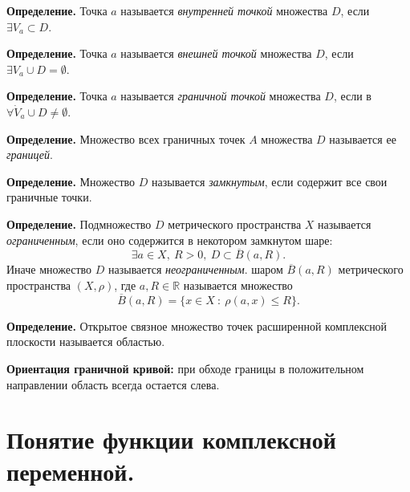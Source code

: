 \documentclass[9pt]{article}
\begin{document}
\par\textbf{Определение.} Точка \(a\) называется \textit{внутренней точкой} множества \(D\), если \(\exists V_a\subset D\).
\par\textbf{Определение.} Точка \(a\) называется \textit{внешней точкой} множества \(D\), если \(\exists V_a\cup D=\emptyset\).
\par\textbf{Определение.} Точка \(a\) называется \textit{граничной точкой} множества \(D\), если в \(\forall \dot{V}_a\cup D\neq\emptyset\).
\par\textbf{Определение.} Множество всех граничных точек \(A\) множества \(D\) называется ее \textit{границей}.
\par\textbf{Определение.} Множество \(D\) называется \textit{замкнутым}, если содержит все свои граничные точки.
\par\textbf{Определение.} Подмножество \(D\) метрического пространства \(X\) называется \textit{ограниченным}, если оно содержится в некотором замкнутом шаре:
\[\exists a\in X,\ R>0,\ D\subset\overline B(a,R).\]
Иначе множество \(D\) называется \textit{неограниченным}.
 шаром \(\overline B(a,R)\) метрического пространства \((X, \rho)\), где \(a,R\in\mathbb R\) называется множество
\[\overline B(a,R)=\{x\in X\ :\ \rho(a,x)\le R\}.\]
\par\textbf{Определение.} Открытое связное множество точек расширенной комплексной плоскости называется областью.
\par\textbf{Ориентация граничной кривой:} при обходе границы в положительном направлении область всегда остается слева.

\section{Понятие функции комплексной переменной.}
\end{document}

